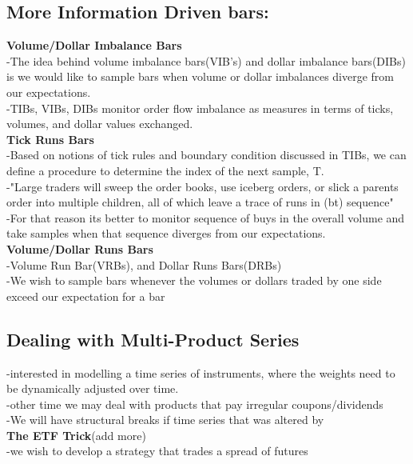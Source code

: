 \documentclass{article}
\begin{document}
\subsection{More Information Driven bars:}
\textbullet \textbf{Volume/Dollar Imbalance Bars}\\ 
-The idea behind volume imbalance bars(VIB's) and dollar imbalance bars(DIBs) is we would like to sample bars when volume or dollar imbalances diverge from our expectations.\\ 
-TIBs, VIBs, DIBs monitor order flow imbalance as measures in terms of ticks, volumes, and dollar values exchanged.\\ 

\textbullet \textbf{Tick Runs Bars}\\ 
-Based on notions of tick rules and boundary condition discussed in TIBs, we can define a procedure to determine the index of the next sample, T.\\ 
-"Large traders will sweep the order books, use iceberg orders, or slick a parents order into multiple children, all of which leave a trace of runs in (bt) sequence"\\ 
-For that reason its better to monitor sequence of buys in the overall volume and take samples when that sequence diverges from our expectations.\\ 

\textbullet \textbf{Volume/Dollar Runs Bars}\\ 
-Volume Run Bar(VRBs), and Dollar Runs Bars(DRBs) \\ 
-We wish to sample bars whenever the volumes or dollars traded by one side exceed our expectation for a bar\\ 

\subsection{Dealing with Multi-Product Series\\ }
-interested in modelling a time series of instruments, where the weights need to be dynamically adjusted over time.\\ 
	\indent-other time we may deal with products that pay irregular coupons/dividends\\ 
-We will have structural breaks if time series that was altered by \\ 
\textbullet \textbf{The ETF Trick}(add more)\\ 
-we wish to develop a strategy that trades a spread of futures\\ 
\end{document}
